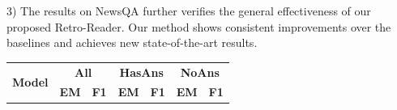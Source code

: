 \documentclass[letterpaper]{article} %
\begin{document}
3) The results on NewsQA further verifies the general
effectiveness of our proposed Retro-Reader. Our method shows consistent improvements over the baselines and achieves new state-of-the-art results.







\begin{table}
	\begin{center}
		\setlength{\tabcolsep}{5pt}
		{
			\begin{tabular}{lllllll}
				\toprule
				\multirow{2}{*}{\textbf{Model}} & \multicolumn{2}{c}{\textbf{All}} & \multicolumn{2}{c}{\textbf{HasAns}} & \multicolumn{2}{c}{\textbf{NoAns}} \\
				& \textbf{EM} & \textbf{F1} & \textbf{EM} & \textbf{F1} & \textbf{EM} & \textbf{F1} \\
				

\end{tabular}}
\end{center}
\end{table}
\end{document}
